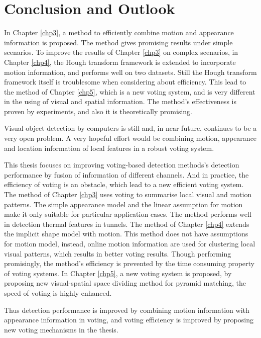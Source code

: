 \chapter{Conclusion and Outlook}
\label{chp6}

In Chapter \ref{chp3}, a method to efficiently combine motion and appearance information is proposed. The method gives promising results under simple scenarios. To improve the results of Chapter \ref{chp3} on complex scenarios, in Chapter \ref{chp4}, the Hough transform framework is extended to incorporate motion information, and performs well on two datasets. Still the Hough transform framework itself is troublesome when considering about efficiency. This lead to the method of Chapter \ref{chp5}, which is a new voting system, and is very different in the using of visual and spatial information. The method's effectiveness is proven by experiments, and also it is theoretically promising.

Visual object detection by computers is still and, in near future, continues to be a very open problem. A very hopeful effort would be combining motion, appearance and location information of local features in a robust voting system.

This thesis focuses on improving voting-based detection methods's detection performance by fusion of information of different channels. And in practice, the efficiency of voting is an obstacle, which lead to a new efficient voting system. The method of Chapter \ref{chp3} uses voting to summarise local visual and motion patterns. The simple appearance model and the linear assumption for motion make it only suitable for particular application cases. The method performs well in detection thermal features in tunnels. The method of Chapter \ref{chp4} extends the implicit shape model with motion. This method does not have assumptions for motion model, instead, online motion information are used for clustering local visual patterns, which results in better voting results. Though performing promisingly, the method's efficiency is prevented by the time consuming property of voting systems. In Chapter \ref{chp5}, a new voting system is proposed, by proposing new visual-spatial space dividing method for pyramid matching, the speed of voting is highly enhanced.

Thus detection performance is improved by combining motion information with appearance information in voting, and voting efficiency is improved by proposing new voting mechanisms in the thesis.

